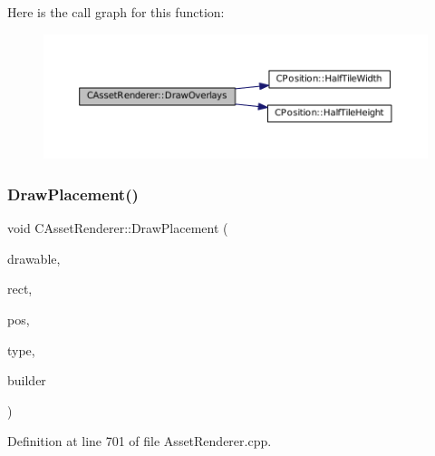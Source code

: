 Here is the call graph for this function\+:\nopagebreak
\begin{figure}[H]
\begin{center}
\leavevmode
\includegraphics[width=350pt]{classCAssetRenderer_a1d2941f9b7aa116f578642c62410bb4a_cgraph}
\end{center}
\end{figure}
\hypertarget{classCAssetRenderer_af9cdf65db6c87c8cfd94fc4a84066b3e}{}\label{classCAssetRenderer_af9cdf65db6c87c8cfd94fc4a84066b3e} 
\subsubsection{\texorpdfstring{Draw\+Placement()}{DrawPlacement()}}
{\footnotesize\ttfamily void C\+Asset\+Renderer\+::\+Draw\+Placement (\begin{DoxyParamCaption}\item[{Gdk\+Drawable $\ast$}]{drawable,  }\item[{const \hyperlink{structSRectangle}{S\+Rectangle} \&}]{rect,  }\item[{const \hyperlink{classCPosition}{C\+Position} \&}]{pos,  }\item[{\hyperlink{GameDataTypes_8h_a5600d4fc433b83300308921974477fec}{E\+Asset\+Type}}]{type,  }\item[{std\+::shared\+\_\+ptr$<$ \hyperlink{classCPlayerAsset}{C\+Player\+Asset} $>$}]{builder }\end{DoxyParamCaption})}



Definition at line 701 of file Asset\+Renderer.\+cpp.


